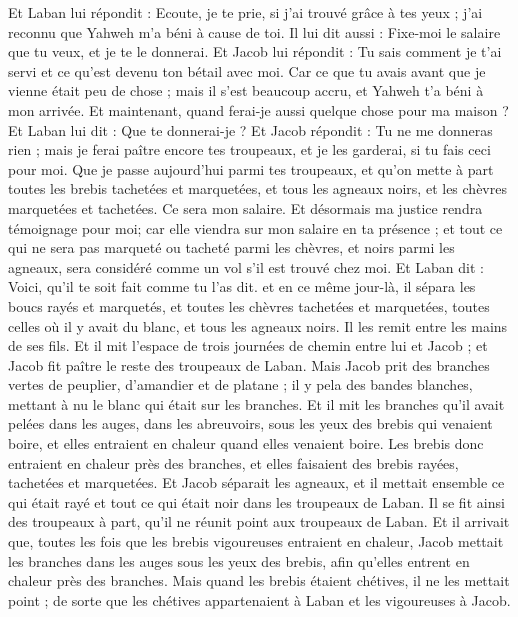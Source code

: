 \begin{multicols}{2}
Et Laban lui répondit : Ecoute, je te prie, si j'ai trouvé grâce à tes yeux ; j'ai reconnu que Yahweh m'a béni à cause de toi.
Il lui dit aussi : Fixe-moi le salaire que tu veux, et je te le donnerai.
Et Jacob lui répondit : Tu sais comment je t'ai servi et ce qu'est devenu ton bétail avec moi.
Car ce que tu avais avant que je vienne était peu de chose ; mais il s'est beaucoup accru, et Yahweh t'a béni à mon arrivée. Et maintenant, quand ferai-je aussi quelque chose pour ma maison ?
Et Laban lui dit : Que te donnerai-je ? Et Jacob répondit : Tu ne me donneras rien ; mais je ferai paître encore tes troupeaux, et je les garderai, si tu fais ceci pour moi.
Que je passe aujourd'hui parmi tes troupeaux, et qu'on mette à part toutes les brebis tachetées et marquetées, et tous les agneaux noirs, et les chèvres marquetées et tachetées. Ce sera mon salaire.
Et désormais ma justice rendra témoignage pour moi; car elle viendra sur mon salaire en ta présence ; et tout ce qui ne sera pas marqueté ou tacheté parmi les chèvres, et noirs parmi les agneaux, sera considéré comme un vol s'il est trouvé chez moi.
Et Laban dit : Voici, qu'il te soit fait comme tu l'as dit.
et en ce même jour-là, il sépara les boucs rayés et marquetés, et toutes les chèvres tachetées et marquetées, toutes celles où il y avait du blanc, et tous les agneaux noirs. Il les remit entre les mains de ses fils.
Et il mit l'espace de trois journées de chemin entre lui et Jacob ; et Jacob fit paître le reste des troupeaux de Laban.
Mais Jacob prit des branches vertes de peuplier, d'amandier et de platane ; il y pela des bandes blanches, mettant à nu le blanc qui était sur les branches.
Et il mit les branches qu'il avait pelées dans les auges, dans les abreuvoirs, sous les yeux des brebis qui venaient boire, et elles entraient en chaleur quand elles venaient boire.
Les brebis donc entraient en chaleur près des branches, et elles faisaient des brebis rayées, tachetées et marquetées.
Et Jacob séparait les agneaux, et il mettait ensemble ce qui était rayé et tout ce qui était noir dans les troupeaux de Laban. Il se fit ainsi des troupeaux à part, qu'il ne réunit point aux troupeaux de Laban.
Et il arrivait que, toutes les fois que les brebis vigoureuses entraient en chaleur, Jacob mettait les branches dans les auges sous les yeux des brebis, afin qu'elles entrent en chaleur près des branches.
Mais quand les brebis étaient chétives, il ne les mettait point ; de sorte que les chétives appartenaient à Laban et les vigoureuses à Jacob.

\end{multicols}
